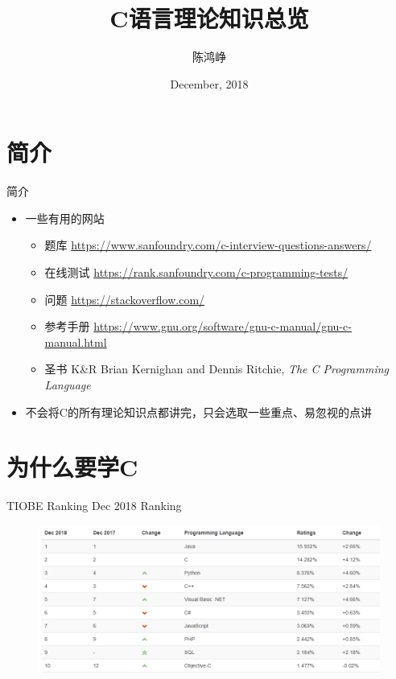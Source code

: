 \documentclass[UTF8]{ctexbeamer}
\title{C语言理论知识总览}
\author[chhzh123]{陈鸿峥}
\date[Dec, 2018]{December, 2018}
\begin{document}
\begin{frame}
\titlepage
\end{frame}

\begin{frame}
\tableofcontents[subsectionstyle=show]
\end{frame}

\section{简介}
\begin{frame}
\sectionpage
\end{frame}

\begin{frame}{简介}
\begin{itemize}
	\item 一些有用的网站
		\begin{itemize}
			\item 题库 \url{https://www.sanfoundry.com/c-interview-questions-answers/}
			\item 在线测试 \url{https://rank.sanfoundry.com/c-programming-tests/}
			\item 问题 \url{https://stackoverflow.com/}
			\item 参考手册 \url{https://www.gnu.org/software/gnu-c-manual/gnu-c-manual.html}
			\item 圣书 K\&R Brian Kernighan and Dennis Ritchie, \emph{The C Programming Language}
		\end{itemize}
	\item 不会将C的所有理论知识点都讲完，只会选取一些重点、易忽视的点讲
\end{itemize}
\end{frame}

\section{为什么要学C}
\begin{frame}
\sectionpage
\end{frame}

\begin{frame}{TIOBE Ranking}
Dec 2018 Ranking
\begin{figure}
\centering
\includegraphics[width=\linewidth]{fig/TIOBE.PNG}
\end{figure}
\end{frame}
\end{document}
